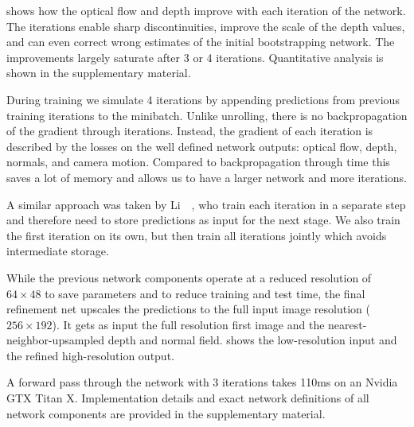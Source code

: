 \documentclass[10pt,twocolumn,letterpaper]{article}
\begin{document}
 shows how the optical flow and depth improve with each iteration of the network. 
The iterations enable sharp discontinuities, improve the scale of the depth values, and can even correct wrong estimates of the initial bootstrapping network.
The improvements largely saturate after 3 or 4 iterations.
Quantitative analysis is shown in the supplementary material.

During training we simulate 4 iterations by appending predictions from previous training iterations to the minibatch.
Unlike unrolling, there is no backpropagation of the gradient through iterations.
Instead, the gradient of each iteration is described by the losses on the well defined network outputs:  optical flow, depth, normals, and camera motion.
Compared to backpropagation through time this saves a lot of memory and allows us to have a larger network and more iterations. 
\begin{NEW}
A similar approach was taken by Li~\etal~\cite{li_iterative_2016}, who train each iteration in a separate step and therefore need to store predictions as input for the next stage.
We also train the first iteration on its own, but then train all iterations jointly which avoids intermediate storage.
\end{NEW}

While the previous network components operate at a reduced resolution of $64\times48$ to save parameters and to reduce training and test time, the final refinement net upscales the predictions to the full input image resolution ($256\times192$).  
It gets as input the full resolution first image and the nearest-neighbor-upsampled depth and normal field.
 shows the low-resolution input and the refined high-resolution output.

A forward pass through the network with 3 iterations takes 110ms on an Nvidia GTX Titan X. 
Implementation details and exact network definitions of all network components are provided in the supplementary material.
\end{document}
